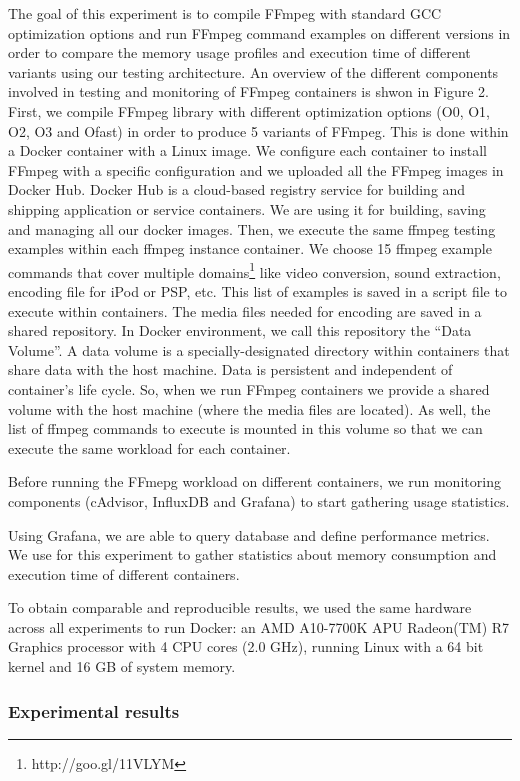The goal of this experiment is to compile FFmpeg with standard GCC optimization options and run FFmpeg command examples on different versions in order to compare the memory usage profiles and execution time of different variants using our testing architecture. An overview of the different components involved in testing and monitoring of FFmpeg containers is shwon in Figure 2. 
First, we compile FFmpeg library with different optimization options  (O0, O1, O2, O3 and Ofast) in order to produce 5 variants of FFmpeg. This is done within a Docker container with a Linux image. We configure
each container to install FFmpeg with a specific configuration and we uploaded all the FFmpeg images in Docker Hub.
Docker Hub is a cloud-based registry service for building and shipping application or
service containers. We are using it for building, saving and managing all our docker
images.
 Then, we execute the same ffmpeg testing examples within each ffmpeg instance container. We choose 15 ffmpeg example commands that cover multiple domains\footnote{http://goo.gl/11VLYM} like video conversion, sound extraction, encoding file for iPod or PSP, etc. This list of examples is saved in a script file to execute within containers. The media files needed for encoding are saved in a shared repository. In Docker environment, we call this repository the “Data Volume”. A data volume is a specially-designated directory within containers that share data with the host machine. Data is persistent and independent of container’s life cycle. So, when we run FFmpeg containers we provide a shared volume with the host
machine (where the media files are located). As well, the list of ffmpeg commands to execute is mounted in this volume so that we can execute the same workload for each container.

Before running the FFmepg workload on different containers, we run monitoring components (cAdvisor, InfluxDB and Grafana) to start gathering usage statistics.

Using Grafana, we are able to query database and define performance metrics. We use for this experiment to gather statistics about memory consumption and execution time of different containers. 

To obtain comparable and reproducible results, we used the same hardware across all experiments to run Docker: an AMD A10-7700K APU Radeon(TM) R7 Graphics processor with 4 CPU cores (2.0 GHz), running Linux with a 64 bit kernel and 16 GB of system memory.

\subsubsection{Experimental results}

